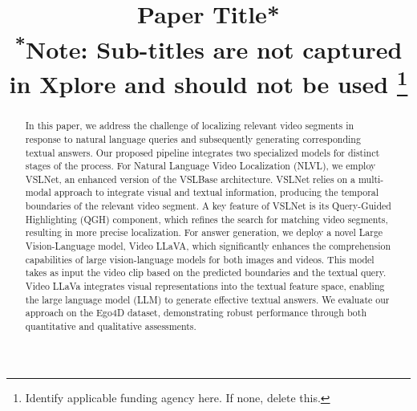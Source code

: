 \documentclass[conference]{IEEEtran}
\begin{document}
\title{Paper Title*\\
{\footnotesize \textsuperscript{*}Note: Sub-titles are not captured in Xplore and
should not be used}
\thanks{Identify applicable funding agency here. If none, delete this.}
}

\author{
\and
{}
\and
{}
}

\maketitle

\begin{abstract}
In this paper, we address the challenge of localizing relevant video segments in response to natural language queries and subsequently generating corresponding textual answers. Our proposed pipeline integrates two specialized models for distinct stages of the process. For Natural Language Video Localization (NLVL), we employ VSLNet, an enhanced version of the VSLBase architecture. VSLNet relies on a multi-modal approach to integrate visual and textual information, producing the temporal boundaries of the relevant video segment. A key feature of VSLNet is its Query-Guided Highlighting (QGH) component, which refines the search for matching video segments, resulting in more precise localization. For answer generation, we deploy a novel Large Vision-Language model, Video LLaVA, which significantly enhances the comprehension capabilities of large vision-language models for both images and videos. This model takes as input the video clip based on the predicted boundaries and the textual query. Video LLaVa integrates visual representations into the textual feature space, enabling the large language model (LLM) to generate effective textual answers. We evaluate our approach on the Ego4D dataset, demonstrating robust performance through both quantitative and qualitative assessments.
\end{abstract}
\end{document}
